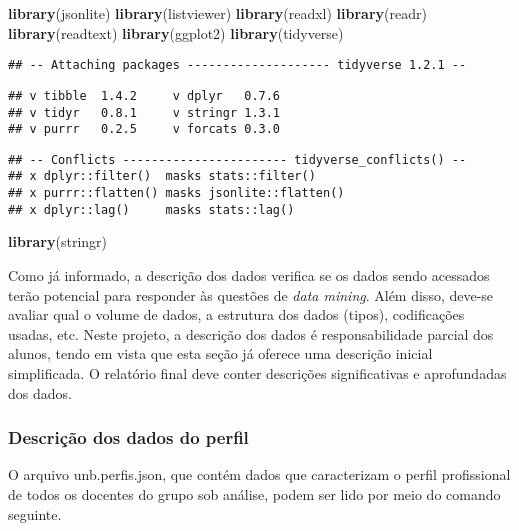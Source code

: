 \documentclass[]{article}
\newenvironment{Shaded}{\begin{snugshade}}{\end{snugshade}}
\newcommand{\KeywordTok}[1]{\textcolor[rgb]{0.13,0.29,0.53}{\textbf{#1}}}
\newcommand{\NormalTok}[1]{#1}
\begin{document}
\begin{Shaded}
\begin{Highlighting}[]
\KeywordTok{library}\NormalTok{(jsonlite)}
\KeywordTok{library}\NormalTok{(listviewer)}
\KeywordTok{library}\NormalTok{(readxl)}
\KeywordTok{library}\NormalTok{(readr)}
\KeywordTok{library}\NormalTok{(readtext)}
\KeywordTok{library}\NormalTok{(ggplot2)}
\KeywordTok{library}\NormalTok{(tidyverse)}
\end{Highlighting}
\end{Shaded}

\begin{verbatim}
## -- Attaching packages -------------------- tidyverse 1.2.1 --
\end{verbatim}

\begin{verbatim}
## v tibble  1.4.2     v dplyr   0.7.6
## v tidyr   0.8.1     v stringr 1.3.1
## v purrr   0.2.5     v forcats 0.3.0
\end{verbatim}

\begin{verbatim}
## -- Conflicts ----------------------- tidyverse_conflicts() --
## x dplyr::filter()  masks stats::filter()
## x purrr::flatten() masks jsonlite::flatten()
## x dplyr::lag()     masks stats::lag()
\end{verbatim}

\begin{Shaded}
\begin{Highlighting}[]
\KeywordTok{library}\NormalTok{(stringr)}
\end{Highlighting}
\end{Shaded}

Como já informado, a descrição dos dados verifica se os dados sendo
acessados terão potencial para responder às questões de \emph{data
mining}. Além disso, deve-se avaliar qual o volume de dados, a estrutura
dos dados (tipos), codificações usadas, etc. Neste projeto, a descrição
dos dados é responsabilidade parcial dos alunos, tendo em vista que esta
seção já oferece uma descrição inicial simplificada. O relatório final
deve conter descrições significativas e aprofundadas dos dados.

\subsubsection{Descrição dos dados do
perfil}\label{descricao-dos-dados-do-perfil}

O arquivo unb.perfis.json, que contém dados que caracterizam o perfil
profissional de todos os docentes do grupo sob análise, podem ser lido
por meio do comando seguinte.
\end{document}
